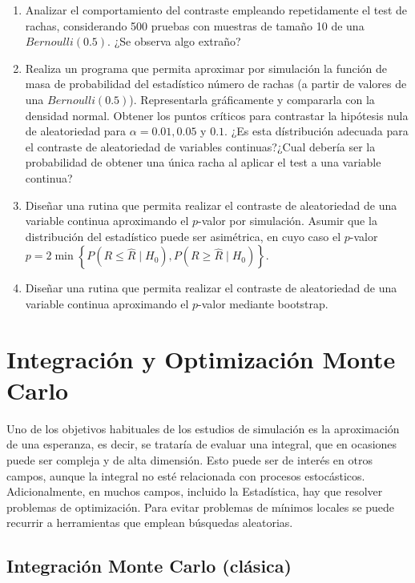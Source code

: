 \documentclass[
]{book}
\theoremstyle{break}
\theoremstyle{definition}
\theoremstyle{definition}
\theoremstyle{definition}
\theoremstyle{remark}
\begin{document}
\begin{enumerate}
\def\labelenumi{\alph{enumi})}
\item
  Analizar el comportamiento del contraste empleando repetidamente
  el test de rachas, considerando 500 pruebas con muestras de
  tamaño 10 de una \(Bernoulli(0.5)\). ¿Se observa algo extraño?
\item
  Realiza un programa que permita aproximar por simulación la
  función de masa de probabilidad del estadístico número de rachas
  (a partir de valores de una \(Bernoulli(0.5)\)). Representarla
  gráficamente y compararla con la densidad normal. Obtener los
  puntos críticos para contrastar la hipótesis nula de
  aleatoriedad para \(\alpha=0.01,0.05\) y \(0.1\). ¿Es esta
  dístribución adecuada para el contraste de aleatoriedad de
  variables continuas?¿Cual debería ser la probabilidad de obtener
  una única racha al aplicar el test a una variable continua?
\item
  Diseñar una rutina que permita realizar el contraste de
  aleatoriedad de una variable continua aproximando el \(p\)-valor
  por simulación. Asumir que la distribución del estadístico puede
  ser asimétrica, en cuyo caso el \(p\)-valor
  \(p=2\min\left\{ P\left( R\leq\hat{R}\mid H_{0}\right) , P\left( R\geq \hat{R}\mid H_{0}\right) \right\}\).
\item
  Diseñar una rutina que permita realizar el contraste de
  aleatoriedad de una variable continua aproximando el \(p\)-valor
  mediante bootstrap.
\end{enumerate}

\hypertarget{cap9}{%
\chapter{Integración y Optimización Monte Carlo}\label{cap9}}

Uno de los objetivos habituales de los estudios de simulación es la aproximación de una esperanza, es decir, se trataría de evaluar una integral, que en ocasiones puede ser compleja y de alta dimensión. Esto puede ser de interés en otros campos, aunque la integral no esté relacionada con procesos estocásticos.
Adicionalmente, en muchos campos, incluido la Estadística, hay que resolver problemas de optimización. Para evitar problemas de mínimos locales se puede recurrir a herramientas que emplean búsquedas aleatorias.

\hypertarget{integraciuxf3n-monte-carlo-cluxe1sica}{%
\section{Integración Monte Carlo (clásica)}\label{integraciuxf3n-monte-carlo-cluxe1sica}}
\end{document}
